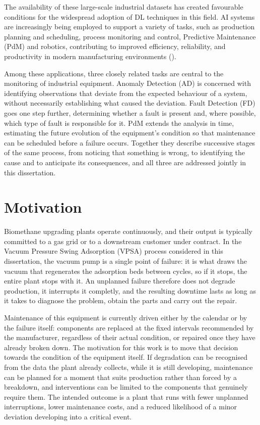 The availability of these large-scale industrial datasets has created favourable conditions for the
widespread adoption of DL techniques in this field. AI systems are increasingly being
employed to support a variety of tasks, such as production planning and scheduling, process monitoring and control, Predictive
Maintenance (PdM) and robotics, contributing to improved efficiency,
reliability, and productivity in modern manufacturing environments (\cite{Cerqueus2025}).

Among these applications, three closely related tasks are central to the monitoring of industrial 
equipment. Anomaly Detection (AD) is concerned with identifying observations that deviate from the 
expected behaviour of a system, without necessarily establishing what caused the deviation. Fault 
Detection (FD) goes one step further, determining whether a fault is present and, where possible, which 
type of fault is responsible for it. PdM extends the analysis in time, estimating the future evolution of 
the equipment's condition so that maintenance can be scheduled before a failure occurs. Together they 
describe successive stages of the same process, from noticing that something is wrong, to identifying the cause and 
to anticipate its consequences, and all three are addressed jointly in this dissertation.

\section{Motivation} \label{sec:motivation}

Biomethane upgrading plants operate continuously, and their output is typically committed to a gas grid 
or to a downstream customer under contract. In the Vacuum Pressure Swing Adsorption (VPSA) process 
considered in this dissertation, the vacuum pump is a single point of failure: it is what draws the vacuum that regenerates the adsorption beds between cycles, 
so if it stops, the entire plant stops with it. An unplanned failure 
therefore does not degrade production, it interrupts it completly, and the resulting downtime lasts as long as it 
takes to diagnose the problem, obtain the parts and carry out the repair.

Maintenance of this equipment is currently driven either by the calendar or by the failure itself: 
components are replaced at the fixed intervals recommended by the manufacturer, regardless of their actual 
condition, or repaired once they have already broken down. The motivation for this work is to move that 
decision towards the condition of the equipment itself. If degradation can be recognised from the data the 
plant already collects, while it is still developing, maintenance can be planned for a moment that suits 
production rather than forced by a breakdown, and interventions can be limited to the components that 
genuinely require them. The intended outcome is a plant that runs with fewer unplanned interruptions, 
lower maintenance costs, and a reduced likelihood of a minor deviation developing into a critical event.


